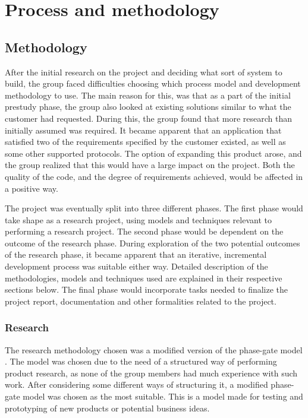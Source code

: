 
\chapter{Process and methodology}
\label{ch:process_and_methodology}

\section{Methodology}
\label{sec:process_and_methodology-process-methodology}

After the initial research on the project and deciding what sort of system to build, the group faced difficulties choosing which process model and development methodology to use. The main reason for this, was that as a part of the initial prestudy phase, the group also looked at existing solutions similar to what the customer had requested. During this, the group found that more research than initially assumed was required. It became apparent that an application that satisfied two of the requirements specified by the customer existed, as well as some other supported protocols. The option of expanding this product arose, and the group realized that this would have a large impact on the project. Both the quality of the code, and the degree of requirements achieved, would be affected in a positive way.

The project was eventually split into three different phases. The first phase would take shape as a research project, using models and techniques relevant to performing a research project. The second phase would be dependent on the outcome of the research phase. During exploration of the two potential outcomes of the research phase, it became apparent that an iterative, incremental development process was suitable either way. Detailed description of the methodologies, models and techniques used are explained in their respective sections below. The final phase would incorporate tasks needed to finalize the project report, documentation and other formalities related to the project.

\subsection{Research}
\label{subsec:process_and_methodology-process-methodology-research}

The research methodology chosen was a modified version of the phase-gate model \cite{phase-gate-model}. The model was chosen due to the need of a structured way of performing product research, as none of the group members had much experience with such work. After considering some different ways of structuring it, a modified phase-gate model was chosen as the most suitable. This is a model made for testing and prototyping of new products or potential business ideas. 

